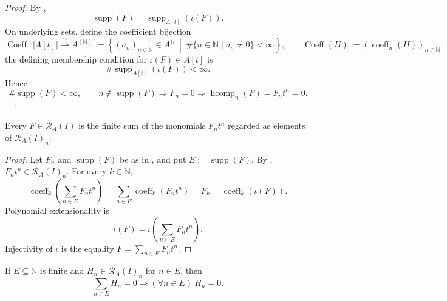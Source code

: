 \begin{proof}
  By ,
  \[
    \operatorname{supp}(F)
      =\operatorname{supp}_{A[t]}(\iota(F)).
  \]
  On underlying sets, define the coefficient bijection
  \[
    \operatorname{Coeff}\colon |A[t]|\xrightarrow{\ \sim\ }
      A^{(\mathbb N)}
      :=\left\{(a_n)_{n\in\mathbb N}\in A^{\mathbb N}
        \ \middle|\
        \#\{n\in\mathbb N\mid a_n\ne0\}<\infty\right\},
    \qquad
    \operatorname{Coeff}(H)
      :=(\operatorname{coeff}_n(H))_{n\in\mathbb N}.
  \]
  the defining membership condition for $\iota(F)\in A[t]$ is
  \[
    \#\operatorname{supp}_{A[t]}(\iota(F))<\infty.
  \]
  Hence
  \[
    \#\operatorname{supp}(F)<\infty,
    \qquad
    n\notin\operatorname{supp}(F)
      \Longrightarrow F_n=0
      \Longrightarrow\operatorname{hcomp}_n(F)=F_nt^n=0.
  \]
\end{proof}

\begin{lemma}
  \label{lemma:nagata-rees-sum-components}

  Every $F\in\mathcal R_A(I)$ is the finite sum of the monomials
  $F_nt^n$ regarded as elements of $\mathcal R_A(I)_n$.
\end{lemma}

\begin{proof}
  Let $F_n$ and $\operatorname{supp}(F)$ be as in
  , and put
  $E:=\operatorname{supp}(F)$.  By
  ,
  $F_nt^n\in\mathcal R_A(I)_n$.  For every $k\in\mathbb N$,
  \[
    \operatorname{coeff}_k\!\left(\sum_{n\in E}F_nt^n\right)
      =\sum_{n\in E}\operatorname{coeff}_k(F_nt^n)
      =F_k
      =\operatorname{coeff}_k(\iota(F)).
  \]
  Polynomial extensionality is
  \[
    \iota(F)=\iota\!\left(\sum_{n\in E}F_nt^n\right).
  \]
  Injectivity of $\iota$ is the equality
  $F=\sum_{n\in E}F_nt^n$.
\end{proof}

\begin{lemma}
  \label{lemma:nagata-rees-components-unique}

  If $E\subseteq\mathbb N$ is finite and
  $H_n\in\mathcal R_A(I)_n$ for $n\in E$, then
  \[
    \sum_{n\in E}H_n=0
      \Longrightarrow (\forall n\in E)\ H_n=0.
  \]
\end{lemma}


